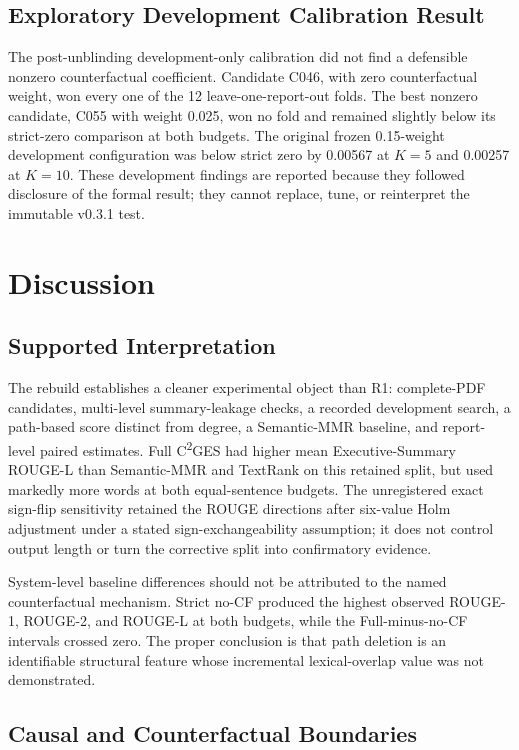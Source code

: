 \documentclass[applsci,article,submit,moreauthors]{Definitions/mdpi}
\newcommand{\cges}{C\textsuperscript{2}GES}
\begin{document}
\subsection{Exploratory Development Calibration Result}

The post-unblinding development-only calibration did not find a defensible nonzero counterfactual coefficient. Candidate C046, with zero counterfactual weight, won every one of the 12 leave-one-report-out folds. The best nonzero candidate, C055 with weight 0.025, won no fold and remained slightly below its strict-zero comparison at both budgets. The original frozen 0.15-weight development configuration was below strict zero by 0.00567 at $K=5$ and 0.00257 at $K=10$. These development findings are reported because they followed disclosure of the formal result; they cannot replace, tune, or reinterpret the immutable v0.3.1 test.

\section{Discussion}

\subsection{Supported Interpretation}

The rebuild establishes a cleaner experimental object than R1: complete-PDF candidates, multi-level summary-leakage checks, a recorded development search, a path-based score distinct from degree, a Semantic-MMR baseline, and report-level paired estimates. Full \cges{} had higher mean Executive-Summary ROUGE-L than Semantic-MMR and TextRank on this retained split, but used markedly more words at both equal-sentence budgets. The unregistered exact sign-flip sensitivity retained the ROUGE directions after six-value Holm adjustment under a stated sign-exchangeability assumption; it does not control output length or turn the corrective split into confirmatory evidence.

System-level baseline differences should not be attributed to the named counterfactual mechanism. Strict no-CF produced the highest observed ROUGE-1, ROUGE-2, and ROUGE-L at both budgets, while the Full-minus-no-CF intervals crossed zero. The proper conclusion is that path deletion is an identifiable structural feature whose incremental lexical-overlap value was not demonstrated.

\subsection{Causal and Counterfactual Boundaries}
\end{document}
